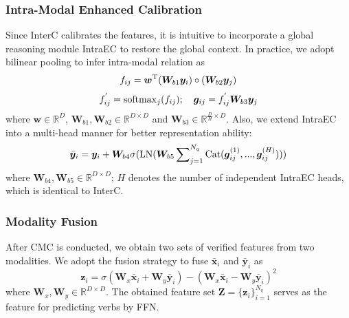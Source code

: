 \documentclass[letterpaper]{article} %
\begin{document}
\subsubsection{Intra-Modal Enhanced Calibration} Since InterC calibrates the features, it is intuitive to incorporate a global reasoning module IntraEC to restore the global context. In practice, we adopt bilinear pooling \cite{kim2016hadamard,yuan2021learningcontext} to infer intra-modal relation as
\begin{equation}
    f_{ij} = \bm{w}^{{\rm T}} (\bm{W}_{b1} \bm{y}_i) \circ (\bm{W}_{b2} \bm{y}_j)
\end{equation}
\begin{equation}
    f_{ij}^{'} = {\rm softmax}_j (f_{ij}); \quad \bm{g}_{ij} = f_{ij}^{'} \bm{W}_{b3} \bm{y}_{j}
\end{equation}
where $\bm{w} \in \mathbb{R}^{D}$, $\bm{W}_{b1},\bm{W}_{b2} \in \mathbb{R}^{D \times D}$ and $\bm{W}_{b3} \in \mathbb{R}^{\frac{D}{H} \times D}$. Also, we extend IntraEC into a multi-head manner for better representation ability:
\begin{equation}
    \bar{\bm{y}}_{i} = \bm{y}_{i} + \bm{W}_{b4} \sigma({\rm LN}(\bm{W}_{b5} \sum\nolimits_{j=1}^{N_q} {\rm Cat}(\bm{g}_{ij}^{(1)},...,\bm{g}_{ij}^{(H)})))
\end{equation}
where $\bm{W}_{b4},\bm{W}_{b5} \in \mathbb{R}^{D \times D}$; $H$ denotes the number of independent IntraEC heads, which is identical to InterC.

\subsubsection{Modality Fusion} After CMC is conducted, we obtain two sets of verified features from two modalities. We adopt the fusion strategy \cite{zhang2018learningtocount} to fuse $\bar{\bm{x}}_{i}$ and $\bar{\bm{y}}_{i}$ as  
\begin{equation}
    \bm{z}_i = \sigma(\bm{W}_x \bar{\bm{x}}_{i} + \bm{W}_y \bar{\bm{y}}_{i}) - (\bm{W}_x \bar{\bm{x}}_{i} - \bm{W}_y \bar{\bm{y}}_{i})^{2}
\end{equation}
where $\bm{W}_x,\bm{W}_y \in \mathbb{R}^{D \times D}$. The obtained feature set $\bm{Z}=\{\bm{z}_i\}_{i=1}^{N_q}$ serves as the feature for predicting verbs by FFN.
\end{document}

